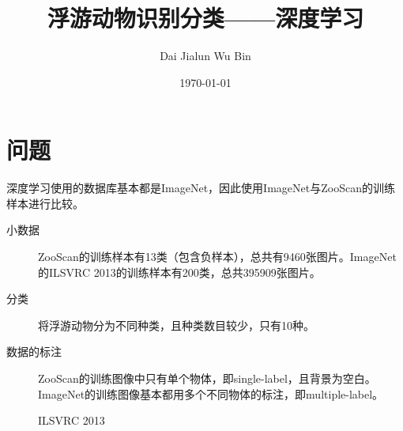 \documentclass[12pt]{article}
\begin{document}
\title{\vspace{-2em} 浮游动物识别分类——深度学习\\
\normalsize{}}
\author{Dai Jialun \hspace{0.25in} Wu Bin}
\date{\vspace{-0.7em} \today \vspace{-0.7em}}
\maketitle\thispagestyle{fancy}
\maketitle
\section{问题}
深度学习使用的数据库基本都是ImageNet，因此使用ImageNet与ZooScan的训练样本进行比较。
\begin{description}
\item[小数据] ZooScan的训练样本有13类（包含负样本），总共有9460张图片。ImageNet的ILSVRC 2013的训练样本有200类，总共395909张图片。
\item[分类] 将浮游动物分为不同种类，且种类数目较少，只有10种。
\item[数据的标注] ZooScan的训练图像中只有单个物体，即single-label，且背景为空白。ImageNet的训练图像基本都用多个不同物体的标注，即multiple-label。
\end{description}
\begin{figure}[!ht]
  \centering 
  \caption{ILSVRC 2013}
\end{figure}
\end{document}
